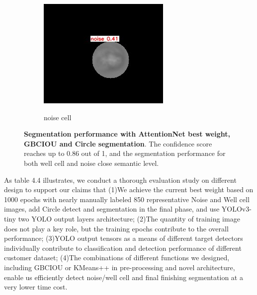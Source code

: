 \begin{figure}[t]
\begin{center}
		\begin{subfigure}[b]{0.25\textwidth}
			\includegraphics[width=\textwidth]{thesis-template-master/images/bestweightonnoise3.jpg}
			\label{fig:Good Cell}
			\caption{noise cell}
		\end{subfigure}
	\end{center}
	\caption{ \textbf{Segmentation performance with AttentionNet best weight, GBCIOU and Circle segmentation}. The confidence score reaches up to 0.86 out of 1, and the segmentation performance for both well cell and noise close semantic level.}
	\label{fig:lennas}
\end{figure}

As table 4.4 illustrates, we conduct a thorough evaluation study on different design to support our claims that
(1)We achieve the current best weight based on 1000 epochs with nearly manually labeled 850 representative Noise and Well cell images, add Circle detect and segmentation in the final phase, and use YOLOv3-tiny two YOLO output layers architecture;
(2)The quantity of training image does not play a key role, but the training epochs contribute to the overall  performance;
(3)YOLO output tensors as a means of different target detectors individually contribute to classification and detection performance of different customer dataset;
(4)The combinations of different functions we designed, including GBCIOU or KMeans++ in pre-processing and novel architecture, enable us efficiently detect noise/well cell and final finishing segmentation at a very lower time cost.


